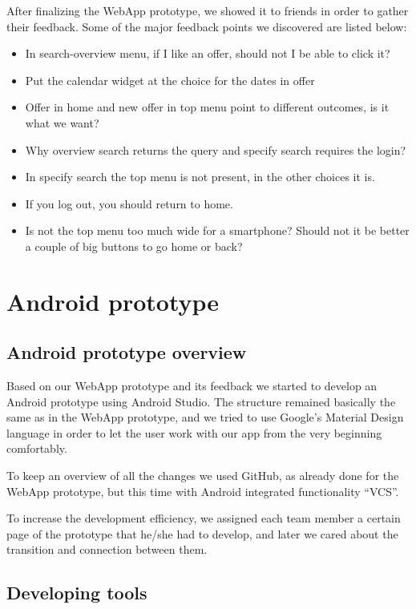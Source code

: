 \documentclass[11pt,twoside,a4paper]{report}
\begin{document}
After finalizing the WebApp prototype, we showed it to friends in order to gather their feedback. Some of the major feedback points we discovered are listed below:

\begin{itemize}
\item In search-overview menu, if I like an offer, should not I be able to click it?
\item Put the calendar widget at the choice for the dates in offer
\item Offer in home and new offer in top menu point to different outcomes, is it what we want?
\item Why overview search returns the query and specify search requires the login?
\item In specify search the top menu is not present, in the other choices it is.
\item If you log out, you should return to home.
\item Is not the top menu too much wide for a smartphone? Should not it be better a couple of big buttons to go home or back?
\end{itemize}

\chapter{Android prototype}

\section{Android prototype overview}

Based on our WebApp prototype and its feedback we started to develop an Android prototype using Android Studio. The structure remained basically the same as in the WebApp prototype, and we tried to use Google's Material Design language in order to let the user work with our app from the very beginning comfortably.

To keep an overview of all the changes we used GitHub, as already done for the WebApp prototype, but this time with Android integrated functionality ``VCS''.

To increase the development efficiency, we assigned each team member a certain page of the prototype that he/she had to develop, and later we cared about the transition and connection between them.

\section{Developing tools}
\end{document}
